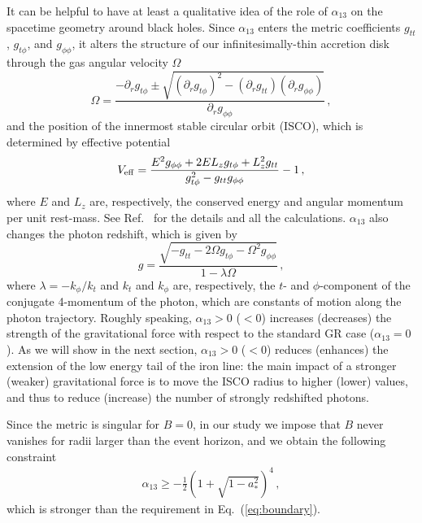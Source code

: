\documentclass[11pt,a4paper,pdftex]{article}
\begin{document}
It can be helpful to have at least a qualitative idea of the role of $\alpha_{13}$ on the spacetime geometry around black holes. Since $\alpha_{13}$ enters the metric coefficients $g_{tt}$, $g_{t\phi}$, and $g_{\phi\phi}$, it alters the structure of our infinitesimally-thin accretion disk through the gas angular velocity $\Omega$
\begin{equation}
\Omega = \frac{- \partial_r g_{t\phi} \pm \sqrt{\left( \partial_r g_{t\phi} \right)^2 
- \left( \partial_r g_{tt} \right)\left( \partial_r g_{\phi\phi} \right)}}{\partial_r g_{\phi\phi}} \, ,
\end{equation}
and the position of the innermost stable circular orbit (ISCO), which is determined by effective potential
\begin{equation}
V_{\rm eff} = \frac{E^2 g_{\phi\phi} + 2 E L_z g_{t\phi} + L_z^2 g_{tt}}{g_{t\phi}^2 - g_{tt} g_{\phi\phi}} - 1 \, ,
\end{equation}
where $E$ and $L_z$ are, respectively, the conserved energy and angular momentum per unit rest-mass. See Ref.~\cite{bambi2016} for the details and all the calculations. $\alpha_{13}$ also changes the photon redshift, which is given by
\begin{equation}
g = \frac{\sqrt{- g_{tt} - 2 \Omega g_{t\phi} - \Omega^2 g_{\phi\phi} }}{1 - \lambda \Omega} \, ,
\end{equation}
where $\lambda = -k_\phi/k_t$ and $k_t$ and $k_\phi$ are, respectively, the $t$- and $\phi$-component of the conjugate 4-momentum of the photon, which are constants of motion along the photon trajectory. Roughly speaking, $\alpha_{13} > 0$ ($< 0$) increases (decreases) the strength of the gravitational force with respect to the standard GR case ($\alpha_{13} = 0$). As we will show in the next section, $\alpha_{13} > 0$ ($< 0$) reduces (enhances) the extension of the low energy tail of the iron line: the main impact of a stronger (weaker) gravitational force is to move the ISCO radius to higher (lower) values, and thus to reduce (increase) the number of strongly redshifted photons.


Since the metric is singular for $B = 0$, in our study we impose that $B$ never vanishes for radii larger than the event horizon, and we obtain the following constraint
\begin{align}
\label{eq:boundary-2}
\alpha_{13} \geq - \frac{1}{2} \left( 1 + \sqrt{1 - a_*^2} \right)^4 \, ,
\end{align}
which is stronger than the requirement in Eq.~(\ref{eq:boundary}).
\end{document}
